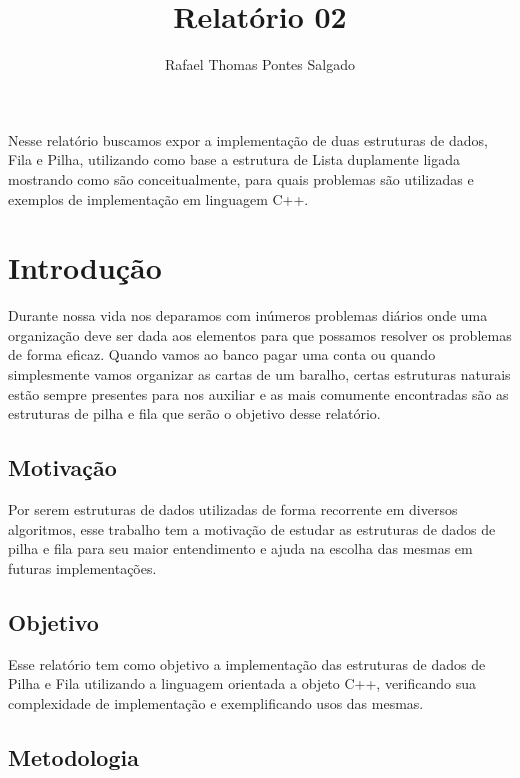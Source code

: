 \documentclass[rascunho,xindy,sublist]{fei}
\author{Rafael Thomas Pontes Salgado}
\title{Relatório 02}
\begin{document}
\maketitle

\begin{resumo}
Nesse relatório buscamos expor a implementação de duas estruturas de dados, Fila e Pilha, utilizando como base a estrutura de Lista duplamente ligada mostrando como são conceitualmente, para quais problemas são utilizadas e exemplos de implementação em linguagem C++.
\end{resumo}

\tableofcontents

\chapter{Introdução}

Durante nossa vida nos deparamos com inúmeros problemas diários onde uma organização deve ser dada aos elementos para que possamos resolver os problemas de forma eficaz. Quando vamos ao banco pagar uma conta ou quando simplesmente vamos organizar as cartas de um baralho, certas estruturas naturais estão sempre presentes para nos auxiliar e as mais comumente encontradas são as estruturas de pilha e fila que serão o objetivo desse relatório.

\section{Motivação}

Por serem estruturas de dados utilizadas de forma recorrente em diversos algoritmos, esse trabalho tem a motivação de estudar as estruturas de dados de pilha e fila para seu maior entendimento e ajuda na escolha das mesmas em futuras implementações.

\section{Objetivo}

Esse relatório tem como objetivo a implementação das estruturas de dados de Pilha e Fila utilizando a linguagem orientada a objeto C++, verificando sua complexidade de implementação e exemplificando usos das mesmas.

\section{Metodologia}
\end{document}
